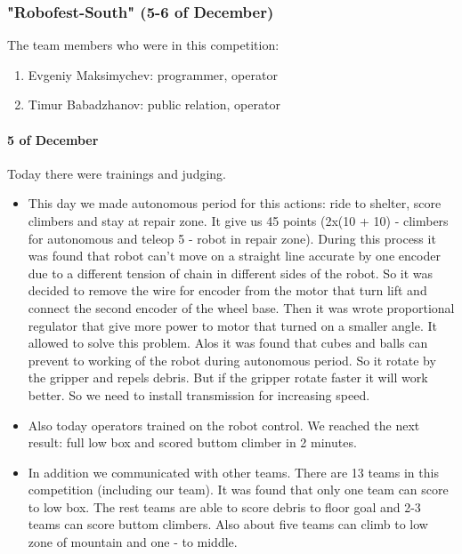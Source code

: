 \subsubsection{"Robofest-South" (5-6 of December)}
The team members who were in this competition:
\begin{enumerate}
	\item Evgeniy Maksimychev: programmer, operator 
	
	\item Timur Babadzhanov: public relation, operator 
\end{enumerate}
\paragraph{5 of December} 
Today there were trainings and judging.
\begin{itemize}
	\item This day we made autonomous period for this actions: ride to shelter, score climbers and stay at repair zone. It give us 45 points (2x(10 + 10) - climbers for autonomous and teleop 5 - robot in repair zone). During this process it was found that robot can't move on a straight line accurate by one encoder due to a different tension of chain in different sides of the robot. So it was decided to remove the wire for encoder from the motor that turn lift and connect the second encoder of the wheel base. Then it was wrote proportional regulator that give more power to motor that turned on a smaller angle. It allowed to solve this problem. Alos it was found that cubes and balls can prevent to working of the robot during autonomous period. So it rotate by the gripper and repels debris. But if the gripper rotate faster it will work better. So we need to install transmission for increasing speed.
	\item Also today operators trained on the robot control. We reached the next result: full low box and scored buttom climber in 2 minutes.
	\item In addition we communicated with other teams. There are 13 teams in this competition (including our team). It was found that only one team can score to low box. The rest teams are able to score debris to floor goal and 2-3 teams can score buttom climbers. Also about five teams can climb to low zone of mountain and one - to middle.
\end{itemize}
